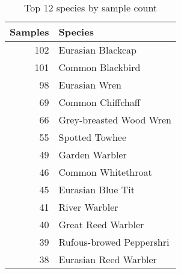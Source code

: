 \begin{table}[h]%
  \centering
    \begin{tabular}{r l}
      Samples & Species \\ \hline
      102 & Eurasian Blackcap\\
      101 & Common Blackbird\\
      98  & Eurasian Wren\\
      69  & Common Chiffchaff\\
      66  & Grey-breasted Wood Wren\\
      55  & Spotted Towhee\\
      49  & Garden Warbler\\
      46  & Common Whitethroat\\
      45  & Eurasian Blue Tit\\
      41  & River Warbler\\
      40  & Great Reed Warbler\\
      39  & Rufous-browed Peppershri\\
      38  & Eurasian Reed Warbler
    \end{tabular}
  \caption{Top 12 species by sample count}\label{tab:top12}
\end{table}

